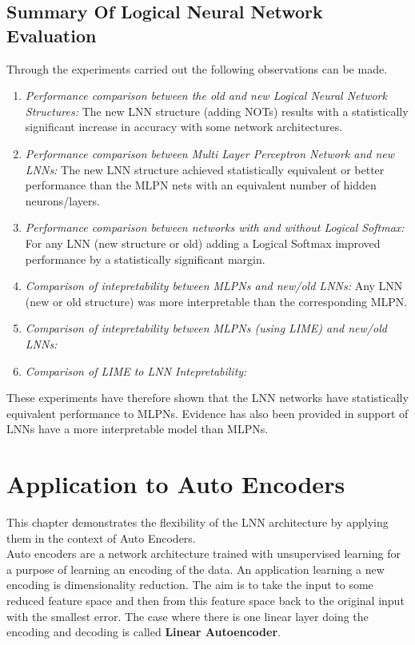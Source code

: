 \section{Summary Of Logical Neural Network Evaluation}
Through the experiments carried out the following observations can be made.

\begin{enumerate}
	\item \textit{Performance comparison between the old and new Logical Neural Network Structures:} The new LNN structure (adding NOTs) results with a statistically significant increase in accuracy with some network architectures.
	\item \textit{Performance comparison between Multi Layer Perceptron Network and new LNNs:} The new LNN structure achieved statistically equivalent or better performance than the MLPN nets with an equivalent number of hidden neurons/layers.
	\item \textit{Performance comparison between networks with and without Logical Softmax:} For any LNN (new structure or old) adding a Logical Softmax improved performance by a statistically significant margin.
	\item \textit{Comparison of intepretability between MLPNs and new/old LNNs:} Any LNN (new or old structure) was more interpretable than the corresponding MLPN.
	\item \textit{Comparison of intepretability between MLPNs (using LIME) and new/old LNNs:}
	\item \textit{Comparison of LIME to LNN Intepretability:}
\end{enumerate}

These experiments have therefore shown that the LNN networks have statistically equivalent performance to MLPNs. Evidence has also been provided in support of LNNs have a more interpretable model than MLPNs.

\chapter{Application to Auto Encoders} \label{C:lnn-application}
This chapter demonstrates the flexibility of the LNN architecture by applying them in the context of Auto Encoders. \\

Auto encoders \cite{baldi2012complex} \cite{hinton2006reducing} are a network architecture trained with unsupervised learning for a purpose of learning an encoding of the data. An application learning a new encoding is dimensionality reduction. The aim is to take the input to some reduced feature space and then from this feature space back to the original input with the smallest error. The case where there is one linear layer doing the encoding and decoding is called \textbf{Linear Autoencoder}.\\

